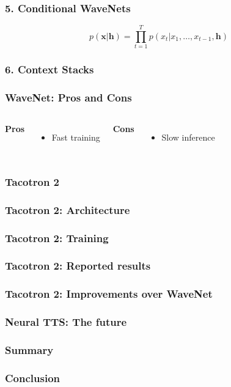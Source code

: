 \documentclass{beamer}
\begin{document}
  \begin{frame}
    \frametitle{5. Conditional WaveNets}
    \begin{equation*}
      p(\mathbf{x} | \mathbf{h}) = \prod_{t=1}^{T}p(x_t | x_1, \ldots, x_{t-1}, \mathbf{h}) 
    \end{equation*}
  \end{frame}

  \begin{frame}
    \frametitle{6. Context Stacks}
  \end{frame}

  \begin{frame}
    \frametitle{WaveNet: Pros and Cons}
    \begin{columns}
        \textbf{Pros}
        \begin{itemize}
          \item Fast training
        \end{itemize}
        \textbf{Cons}
        \begin{itemize}
          \item Slow inference
        \end{itemize}
    \end{columns}
  \end{frame}

  \begin{frame}
    \frametitle{Tacotron 2}
  \end{frame}

  \begin{frame}
    \frametitle{Tacotron 2: Architecture}
  \end{frame}

  \begin{frame}
    \frametitle{Tacotron 2: Training}
  \end{frame}

  \begin{frame}
    \frametitle{Tacotron 2: Reported results}
  \end{frame}

  \begin{frame}
    \frametitle{Tacotron 2: Improvements over WaveNet}
  \end{frame}

  \begin{frame}
    \frametitle{Neural TTS: The future}
  \end{frame}

  \begin{frame}
    \frametitle{Summary}
  \end{frame}

  \begin{frame}
    \frametitle{Conclusion}
  \end{frame}
  
\end{document}
